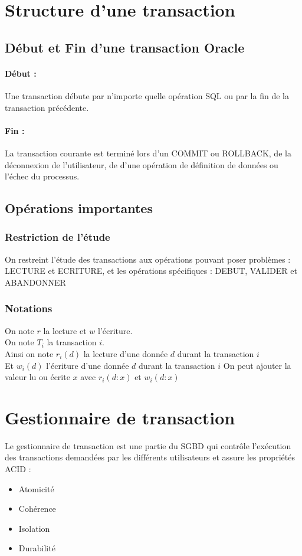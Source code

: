 \documentclass[10pt,a4paper,twoside]{article}
\begin{document}
\section{Structure d'une transaction}
\subsection{Début et Fin d'une transaction Oracle}
\paragraph{Début :} Une transaction débute par n'importe quelle opération SQL ou par la fin de la transaction précédente.

\paragraph{Fin :} La transaction courante est terminé lors d'un COMMIT ou ROLLBACK, de la déconnexion de l'utilisateur, de d'une opération de définition de données ou l'échec du processus.

\subsection{Opérations importantes}
\subsubsection{Restriction de l'étude}
On restreint l'étude des transactions aux opérations pouvant poser problèmes : LECTURE et ECRITURE, et les opérations spécifiques : DEBUT, VALIDER et ABANDONNER

\subsubsection{Notations}
\begin{flushleft}
On note $r$ la lecture et $w$ l'écriture.\\
On note $T_{i}$ la transaction $i$.\\
Ainsi on note $r_{i}(d)$ la lecture d'une donnée $d$ durant la transaction $i$\\
Et $w_{i}(d)$ l'écriture d'une donnée $d$ durant la transaction $i$
On peut ajouter la valeur lu ou écrite $x$ avec $r_{i}(d:x)$ et $w_{i}(d:x)$
\end{flushleft}

\section{Gestionnaire de transaction}
Le gestionnaire de transaction est une partie du SGBD qui contrôle l'exécution des transactions demandées par les différents utilisateurs et assure les propriétés ACID :
\begin{itemize}
\item Atomicité
\item Cohérence
\item Isolation
\item Durabilité
\end{itemize}
\end{document}
